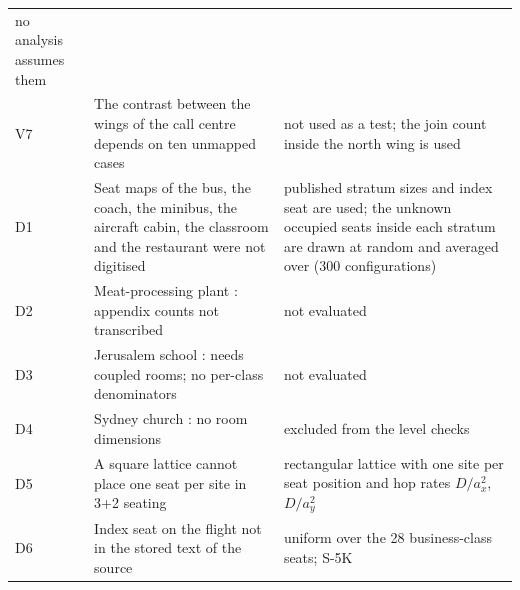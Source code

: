 \begin{table}[tbp]
\begin{tabular}{@{}l>{\raggedright\arraybackslash}p{}>{\raggedright\arraybackslash}p{}@{}}
         no analysis assumes them \\
    V7 & The contrast between the wings of the call centre depends on ten unmapped cases &
         not used as a test; the join count inside the north wing is used \\
    \addlinespace
    D1 & Seat maps of the bus, the coach, the minibus, the aircraft cabin, the classroom and the restaurant
         were not digitised &
         published stratum sizes and index seat are used; the unknown occupied seats inside each stratum are
         drawn at random and averaged over (300 configurations) \\
    D2 & Meat-processing plant \citep{guenther2020}: appendix counts not transcribed & not evaluated \\
    D3 & Jerusalem school \citep{steinzamir2020}: needs coupled rooms; no per-class denominators & not
         evaluated \\
    D4 & Sydney church \citep{katelaris2021}: no room dimensions & excluded from the level checks \\
    D5 & A square lattice cannot place one seat per site in 3+2 seating &
         rectangular lattice with one site per seat position and hop rates $D/a_x^2$, $D/a_y^2$ \\
    D6 & Index seat on the flight not in the stored text of the source &
         uniform over the 28 business-class seats; S-5K \\
    \bottomrule
  \end{tabular}
\end{table}

